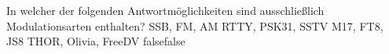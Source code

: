     {In welcher der folgenden Antwortmöglichkeiten sind ausschließlich Modulationsarten enthalten? }
    {SSB, FM, AM}
    {RTTY, PSK31, SSTV}
    {M17, FT8, JS8}
    {THOR, Olivia, FreeDV}
    {false}{false}